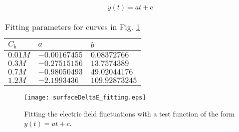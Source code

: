 \begin{align}
	y(t) = a t + c
\end{align}

\begin{table}[htbp]
\centering
\begin{tabular}{lll}
$C_b$   & $a$           & $b$            \\\hline
$0.01M$ & $-0.00167455$ & $0.08372766$   \\
$0.3M$  & $-0.27515156$ & $13.7574389$   \\
$0.7M$  & $-0.98050493$ & $49.02044176$  \\
$1.2M$  & $-2.1993436$  & $109.92873245$
\end{tabular}
\caption{Fitting parameters for curves in Fig. \ref{fig:efield-noise-fit}}
\label{table:fittin-params}
\end{table}


\newpage
\begin{figure}[htbp]
\centering
\texttt{[image: surfaceDeltaE\_fitting.eps]}
\caption{Fitting the electric field fluctuations with a test function of the form $y(t) = a t + c$.}
\label{fig:efield-noise-fit}
\end{figure}




\newpage



